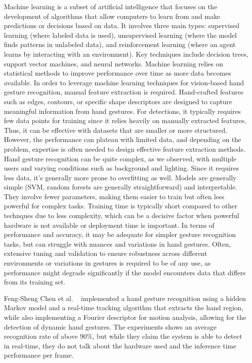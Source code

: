\documentclass[12pt]{article}
\begin{document}
Machine learning is a subset of artificial intelligence that focuses on the development of algorithms that allow computers to learn from and make predictions or decisions based on data. It involves three main types: supervised learning (where
labeled data is used), unsupervised learning (where the model finds patterns in unlabeled data), and reinforcement learning (where an agent learns by interacting with an environment). Key techniques include decision trees, support vector machines, and neural networks. Machine learning relies on statistical methods to improve performance over time as more data becomes available.
In order to leverage machine learning techniques for vision-based hand gesture recognition, manual feature extraction is required. Hand-crafted features such as edges, contours, or specific shape descriptors are designed to capture meaningful information from hand gestures. For detections, it typically requires few data points for training since it relies heavily on manually extracted features. Thus, it can be effective with datasets that are smaller or more structured. However, the performance can plateau with limited data, and depending on the problem, expertise is often needed to design effective feature extraction methods. Hand gesture recognition can be quite complex, as we observed, with multiple users and varying conditions such as background and lighting. Since it requires less data, it's generally more prone to overfitting as well.
Models are generally simple (SVM, random forests are generally straightforward) and interpretable. They involve fewer parameters, making them easier to train but often less powerful for complex tasks. Training time is typically short compared to other technques due to less complexity, which can be a decisive factor when powerful hardware is not available or deployment time is important.
In terms of performance and accuracy, it may be adequate for simpler gesture recognition tasks, but can struggle with nuances and variations in hand gestures. Often, extensive tuning and validation to ensure robustness across different environments or variations in gestures is required to be of any use, as performance might degrade significantly if the model encounters data that differs from its training set.

Feng-Sheng Chen et al. ~\cite{CHEN2003745} implemented a hand gesture recognition using a hidden Markov model and a real-time tracking algorithm that extracts the hand region, while also implementing a Fourier descriptor for motion analysis, allowing for the detection of dynamic hand gestures. The experiments shows an average recognition rate of above 90\%, but while they claim the system is able to detect in real-time, they do not talk about the hardware used and the inference time performance per frame.
\end{document}
